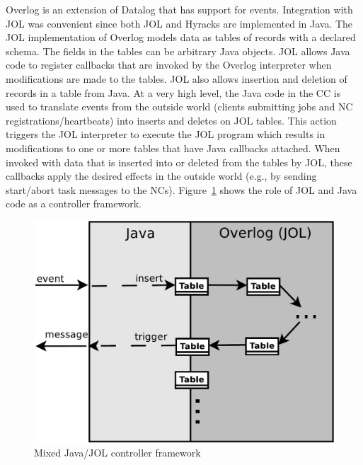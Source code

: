 Overlog is an extension of Datalog that has support
for events. Integration with JOL was convenient since both JOL and Hyracks are implemented in Java. The JOL implementation of Overlog models data as tables of records with
a declared schema. The fields in the tables can be arbitrary Java objects. JOL allows
Java code to register callbacks that are invoked by the Overlog interpreter when modifications are made to the tables. JOL also allows insertion and deletion of records
in a table from Java. At a very high level, the Java code in the CC is used to translate events from the outside world (clients submitting jobs and NC registrations/heartbeats)
into inserts and deletes on JOL tables. This action triggers the JOL interpreter to execute the JOL program which results in modifications to one or more tables that have
Java callbacks attached. When invoked with data that is inserted into or deleted from the tables by JOL, these callbacks apply the desired effects in the outside world
(e.g., by sending start/abort task messages to the NCs). Figure~\ref{fig:jolcontroller} shows the role of JOL and Java code as a controller framework.

\vspace{-1mm}
\begin{figure} [htb!]
  \centering
  \includegraphics[scale=0.5]{images/jolcontroller}
  \caption{Mixed Java/JOL controller framework}
  \label{fig:jolcontroller}
\end{figure}
\vspace{-1mm}

